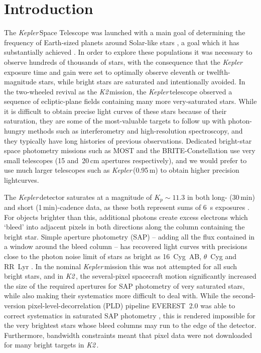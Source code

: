 \documentclass[modern]{aastex62}
\newcommand\kepler{\emph{Kepler}\,}
\newcommand\ktwo{\emph{K2}\,}
\begin{document}


\section{Introduction} 
\label{sec:intro}

The \kepler Space Telescope was launched with a main goal of determining the frequency of Earth-sized planets around Solar-like stars \citep{2010sci...327..977b}, a goal which it has substantially achieved \citep[e.g.][]{2013ApJ...766...81F,2013PNAS..11019273P,2014ApJ...795...64F}. In order to explore these populations it was necessary to observe hundreds of thousands of stars, with the consequence that the \kepler exposure time and gain were set to optimally observe eleventh or twelfth-magnitude stars, while bright stars are saturated and intentionally avoided. In the two-wheeled revival as the \ktwo mission, the \kepler telescope observed a sequence of ecliptic-plane fields containing many more very-saturated stars. While it is difficult to obtain precise light curves of these stars because of their saturation, they are some of the most-valuable targets to follow up with photon-hungry methods such as interferometry and high-resolution spectroscopy, and they typically have long histories of previous observations. Dedicated bright-star space photometry missions such as MOST \citep{most} and the BRITE-Constellation \citep{brite,brite2} use very small telescopes (15 and~20\,cm apertures respectively), and we would prefer to use much larger telescopes such as \kepler (0.95\,m) to obtain higher precision lightcurves. 

The \kepler detector saturates at a magnitude of $K_p \sim 11.3$ in both long- (30\,min) and short (1\,min)-cadence data, as these both represent sums of 6~s exposures \citep{Gilliland2010}. For objects brighter than this, additional photons create excess electrons which `bleed' into adjacent pixels in both directions along the column containing the bright star. Simple aperture photometry (SAP) -- adding all the flux contained in a window around the bleed column -- has recovered light curves with precisions close to the photon noise limit of stars as bright as 16~Cyg~AB, $\theta$~Cyg and RR~Lyr \citep[e.g.][]{Kolenberg2011,2013MNRAS.433.1262W,Guzik2016}. In the nominal \kepler mission this was not attempted for all such bright stars, and in \ktwo, the several-pixel spacecraft motion significantly increased the size of the required apertures for SAP photometry of very saturated stars, while also making their systematics more difficult to deal with. While the second-version pixel-level-decorrelation (PLD) pipeline EVEREST~2.0 was able to correct systematics in saturated SAP photometry \citep{everest2}, this is rendered impossible for the very brightest stars whose bleed columns may run to the edge of the detector. Furthermore, bandwidth constraints meant that pixel data were not downloaded for many bright targets in \ktwo. 
\end{document}
